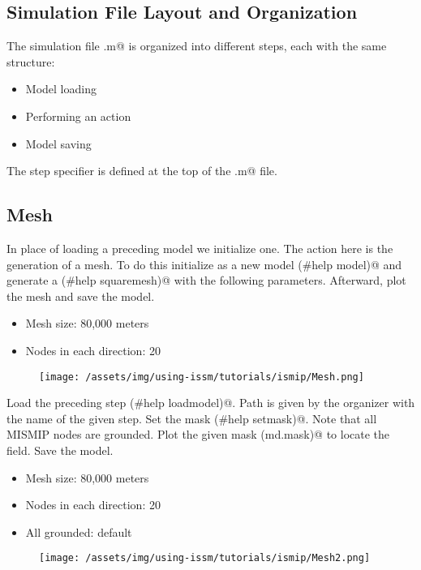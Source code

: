 \subsection{Simulation File Layout and Organization}  %
The simulation file \verb@runme.m@ is organized into different steps, each with the same structure:
\begin{itemize}
	\item Model loading
	\item Performing an action
	\item Model saving
\end{itemize}
The step specifier \verb@steps@ is defined at the top of the \verb@runme.m@ file.
\subsection{Mesh} %
In place of loading a preceding model we initialize one. The action here is the generation of a mesh. To do this initialize \verb@md@ as a new model \verb@(#help model)@ and generate a \verb@squaremesh@ \verb@(#help squaremesh)@ with the following parameters. Afterward, plot the mesh and save the model.
\begin{itemize}
	\item Mesh size: 80,000 meters
	\item Nodes in each direction: 20
\end{itemize}
\begin{figure}[H]
	\begin{center}
		\texttt{[image: /assets/img/using-issm/tutorials/ismip/Mesh.png]}
	\end{center}
\end{figure}
Load the preceding step \verb@(#help loadmodel)@. Path is given by the organizer with the name of the given step. Set the mask \verb@(#help setmask)@. Note that all MISMIP nodes are grounded. Plot the given mask \verb@(md.mask)@ to locate the field. Save the model.
\begin{itemize}
	\item Mesh size: 80,000 meters
	\item Nodes in each direction: 20
	\item All grounded: default
		\end{itemize}
		\begin{figure}[H]
			\begin{center}
				\texttt{[image: /assets/img/using-issm/tutorials/ismip/Mesh2.png]}
			\end{center}
		\end{figure}
